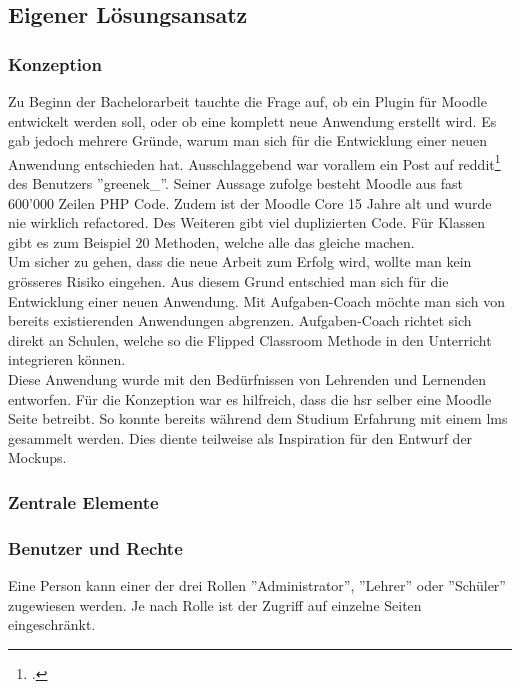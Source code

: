 \newpage

\subsection{Eigener Lösungsansatz}
\subsubsection{Konzeption}

Zu Beginn der Bachelorarbeit tauchte die Frage auf, ob ein Plugin für Moodle entwickelt werden soll, oder ob eine komplett neue Anwendung erstellt wird. Es gab jedoch mehrere Gründe, warum man sich für die Entwicklung einer neuen Anwendung entschieden hat. Ausschlaggebend war vorallem ein Post auf reddit\footcite{moodle_bericht} des Benutzers ''greenek\_''. Seiner Aussage zufolge besteht Moodle aus fast 600'000 Zeilen PHP Code. Zudem ist der Moodle Core 15 Jahre alt und wurde nie wirklich refactored. Des Weiteren gibt viel duplizierten Code. Für Klassen gibt es zum Beispiel 20 Methoden, welche alle das gleiche machen. \\

Um sicher zu gehen, dass die neue Arbeit zum Erfolg wird, wollte man kein grösseres Risiko eingehen. Aus diesem Grund entschied man sich für die Entwicklung einer neuen Anwendung. Mit Aufgaben-Coach möchte man sich von bereits existierenden Anwendungen abgrenzen. Aufgaben-Coach richtet sich direkt an Schulen, welche so die Flipped Classroom Methode in den Unterricht integrieren können. \\

Diese Anwendung wurde mit den Bedürfnissen von Lehrenden und Lernenden entworfen. Für die Konzeption war es hilfreich, dass die \gls{hsr} selber eine Moodle Seite betreibt. So konnte bereits während dem Studium Erfahrung mit einem \gls{lms} gesammelt werden. Dies diente teilweise als Inspiration für den Entwurf der Mockups.

\subsubsection{Zentrale Elemente}
\subsubsection*{Benutzer und Rechte}
Eine Person kann einer der drei Rollen ''Administrator'', ''Lehrer'' oder ''Schüler'' zugewiesen werden. Je nach Rolle ist der Zugriff auf einzelne Seiten eingeschränkt. \\


